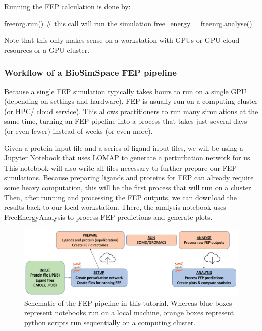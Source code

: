 \noindent Running the FEP calculation is done by:

\begin{python}
freenrg.run() # this call will run the simulation
free_energy = freenrg.analyse()
\end{python}

\noindent Note that this only makes sense on a workstation with GPUs or GPU cloud resources or a GPU cluster. 

\subsubsection{Workflow of a BioSimSpace FEP pipeline}

Because a single FEP simulation typically takes hours to run on a
single GPU (depending on settings and hardware), FEP is usually run on a
computing cluster (or HPC/ cloud service). This allows practitioners to
run many simulations at the same time, turning an FEP pipeline into a
process that takes just several days (or even fewer) instead of weeks (or
even more).

Given a protein input file and a series of ligand input files, we will
be using a Jupyter Notebook that uses LOMAP to generate a perturbation
network for us. This notebook will also write all files necessary to
further prepare our FEP simulations. Because preparing ligands and
proteins for FEP can already require some heavy computation, this will
be the first process that will run on a cluster. Then, after running and
processing the FEP outputs, we can download the results back to our
local workstation. There, the analysis notebook uses FreeEnergyAnalysis
to process FEP predictions and generate plots.

\begin{figure}[htp]
\includegraphics[width=\linewidth]{04_fep/inputs/tut_imgs/fep_pipeline.png}
\caption{Schematic of the FEP pipeline in this tutorial. Whereas blue boxes
represent notebooks run on a local machine, orange boxes represent
python scripts run sequentially on a computing cluster.}
\label{fep_pipeline_fig}
\end{figure}


